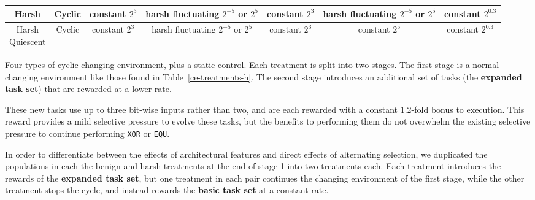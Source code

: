 \documentclass[10pt,letterpaper,final]{article}
\begin{document}
\begin{table}[]
\begin{tabular}{|c|c||c|c||c|c|c|}
	Harsh & Cyclic & \makecell{constant \\ $2^3$} & \makecell{harsh \\ fluctuating \\ $2^{-5}$ or $2^5$} & \makecell{constant \\ $2^3$} & \makecell{harsh \\ fluctuating \\ $2^{-5}$ or $2^5$} & \makecell{constant \\ $2^{0.3}$} \\\hline
	\makecell{Harsh \\ Quiescent} & Cyclic & \makecell{constant \\ $2^3$} & \makecell{harsh \\ fluctuating \\ $2^{-5}$ or $2^5$} & \makecell{constant \\ $2^3$} & \makecell{constant \\ $2^5$} & \makecell{constant \\ $2^{0.3}$} \\\hline
	\end{tabular} 

	\begin{flushleft} Four types of cyclic changing environment, plus a static control. Each treatment is split into two stages. The first stage is a normal changing environment like those found in Table~\ref{ce-treatments-h}. The second stage introduces an additional set of tasks (the \textbf{expanded task set}) that are rewarded at a lower rate.
	\end{flushleft}
	\label{cel-treatments-simple}
	\end{table}

These new tasks use up to three bit-wise inputs rather than two, and are each rewarded with a constant 1.2-fold bonus to execution. This reward provides a mild selective pressure to evolve these tasks, but the benefits to performing them do not overwhelm the existing selective pressure to continue performing \texttt{XOR} or \texttt{EQU}.

In order to differentiate between the effects of architectural features and direct effects of alternating selection, we duplicated the populations in each the benign and harsh treatments at the end of stage 1 into two treatments each. Each treatment introduces the rewards of the \textbf{expanded task set}, but one treatment in each pair continues the changing environment of the first stage, while the other treatment stops the cycle, and instead rewards the \textbf{basic task set} at a constant rate.
\end{document}
